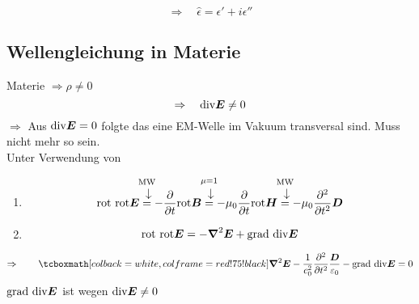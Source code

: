 \begin{equation*}
\Rightarrow \quad \hat{\epsilon} = \epsilon' + i \epsilon''
\end{equation*}

\subsection{Wellengleichung in Materie}

Materie $ \Rightarrow \rho \neq 0 $
\begin{equation*}
\Rightarrow \quad \textrm{div} \boldsymbol{E} \neq 0
\end{equation*}
$ \Rightarrow $ Aus $ \textrm{div} \boldsymbol{E} = 0 $ folgte das eine EM-Welle im Vakuum transversal sind. Muss nicht mehr so sein.\\[5pt]
Unter Verwendung von
\begin{enumerate}[(1)]
	\item \begin{equation*}
	\tx{rot rot} \vec{E} \custoup{\rightarrow}{=}{\mathclap{\tx{MW}}} - \prt{}{t} \tx{rot} \vec{B} \custoup{\rightarrow}{=}{\mathclap{\mu = 1}} - \mu_0 \prt{}{t} \tx{rot} \vec{H} \custoup{\rightarrow}{=}{\mathclap{\tx{MW}}} - \mu_0 \prt{^2}{t^2} \vec{D}
	\end{equation*}
	\item \begin{equation*}
	\textrm{rot rot} \boldsymbol{E} = - \boldsymbol{\nabla}^2 \boldsymbol{E} + \textrm{grad div} \boldsymbol{E}
	\end{equation*}
\end{enumerate}


\begin{equation*}
\Rightarrow \qquad \rmbox{\vabla^2 \vec{E} - \frac{1}{c_0^2} \prt{^2}{t^2} \frac{\vec{D}}{\epsilon_0} - \tx{grad div} \vec{E} = 0}
\end{equation*}
\color{black!20!red} $ \textrm{grad div} \boldsymbol{E} $ ist wegen $ \textrm{div} \boldsymbol{E} \neq 0 $ \color{black}


